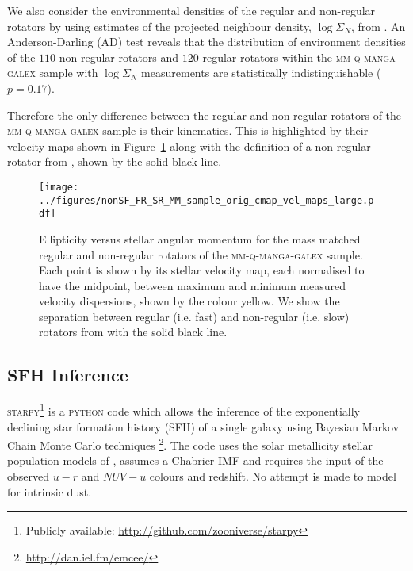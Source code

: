 \documentclass[useAMS,usenatbib]{mn2e}
\begin{document}
We also consider the environmental densities of the regular and non-regular rotators by using estimates of the projected neighbour density,  $\log\Sigma_N$, from \cite{bamford09}. An Anderson-Darling (AD) test reveals that the distribution of environment densities of the $110$ non-regular rotators and $120$ regular rotators within the \textsc{mm-q-manga-galex} sample with $\log\Sigma_N$ measurements are statistically indistinguishable ($p=0.17$).  

Therefore the only difference between the regular and non-regular rotators of the \textsc{mm-q-manga-galex} sample is their kinematics. This is highlighted by their velocity maps shown in Figure~\ref{fig:evsl} along with the definition of a non-regular rotator from \cite{cappellari16}, shown by the solid black line. 


\begin{figure}
\centering
\texttt{[image: ../figures/nonSF\_FR\_SR\_MM\_sample\_orig\_cmap\_vel\_maps\_large.pdf]}
\caption{Ellipticity versus stellar angular momentum for the mass matched regular and non-regular rotators of the \textsc{mm-q-manga-galex} sample. Each point is shown by its stellar velocity map, each normalised to have the midpoint, between maximum and minimum measured velocity dispersions, shown by the colour yellow. We show the separation between regular (i.e. fast) and non-regular (i.e. slow) rotators from \protect\cite{cappellari16} with the solid black line.}
\label{fig:evsl}
\end{figure}


\subsection{SFH Inference}\label{sec:starpy}

\textsc{starpy}\footnote{Publicly available: \url{http://github.com/zooniverse/starpy}} is a \textsc{python} code which allows the inference of the exponentially declining star formation history (SFH) of a single galaxy using  Bayesian Markov Chain Monte Carlo techniques \citep{emcee13}\footnote{\url{http://dan.iel.fm/emcee/}}. The code uses the solar metallicity stellar population models of \cite[][hereafter BC03]{BC03}, assumes a Chabrier IMF \citep{chabrier03} and requires the input of the observed $u-r$ and $NUV-u$ colours and redshift. No attempt is made to model for intrinsic dust. 
\end{document}
